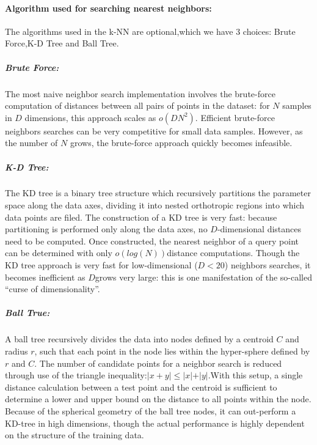 \documentclass{article}
\begin{document}
	\paragraph{Algorithm used for searching nearest neighbors:}The algorithms used in the k-NN are optional,which we have 3 choices: Brute Force,K-D Tree and Ball Tree.
	\subparagraph{Brute Force:}The most naive neighbor search implementation involves the brute-force computation of distances between all pairs of points in the dataset: for $N$ samples in $D$ dimensions, this approach scales as $ o(DN^2) $. Efficient brute-force neighbors searches can be very competitive for small data samples. However, as the number of  $ N $ grows, the brute-force approach quickly becomes infeasible. 
	\subparagraph{K-D Tree:} The KD tree is a binary tree structure which recursively partitions the parameter space along the data axes, dividing it into nested orthotropic regions into which data points are filed. The construction of a KD tree is very fast: because partitioning is performed only along the data axes, no $ D $-dimensional distances need to be computed. Once constructed, the nearest neighbor of a query point can be determined with only $ o(log(N)) $distance computations. Though the KD tree approach is very fast for low-dimensional ($ D<20 $) neighbors searches, it becomes inefficient as $ D $grows very large: this is one manifestation of the so-called “curse of dimensionality”.
	\subparagraph{Ball True:}A ball tree recursively divides the data into nodes defined by a centroid $ C $ and radius $ r $, such that each point in the node lies within the hyper-sphere defined by $ r $ and $ C $. The number of candidate points for a neighbor search is reduced through use of the triangle inequality:$ \vert{x+y}\vert\leq\vert{x}\vert + \vert{y}\vert $.With this setup, a single distance calculation between a test point and the centroid is sufficient to determine a lower and upper bound on the distance to all points within the node. Because of the spherical geometry of the ball tree nodes, it can out-perform a KD-tree in high dimensions, though the actual performance is highly dependent on the structure of the training data.
\end{document}

